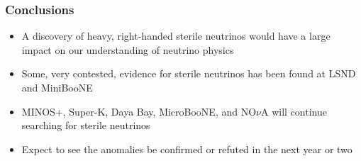 \documentclass[mathserif,18pt,xcolor=table]{beamer}
\begin{document}
\begin{frame}
  \frametitle{Conclusions}
  \begin{itemize}
  \item A discovery of heavy, right-handed sterile neutrinos would have a large impact on our understanding of neutrino physics
  \item Some, very contested, evidence for sterile neutrinos has been found at LSND and MiniBooNE
  \item MINOS+, Super-K, Daya Bay, MicroBooNE, and NO$\nu$A will continue searching for sterile neutrinos
  \item Expect to see the anomalies be confirmed or refuted in the next year or two
  \end{itemize}
\end{frame}
\end{document}
